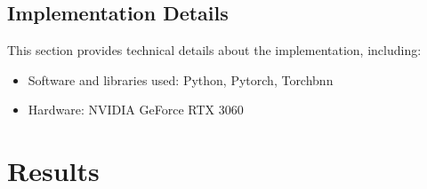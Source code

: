 \documentclass[final-report]{report-template}
\begin{document}

\subsection{Implementation Details}
This section provides technical details about the implementation, including:
\begin{itemize}
    \item Software and libraries used: Python, Pytorch, Torchbnn
    \item Hardware:  NVIDIA GeForce RTX 3060
\end{itemize}

\section{Results}
\end{document}
